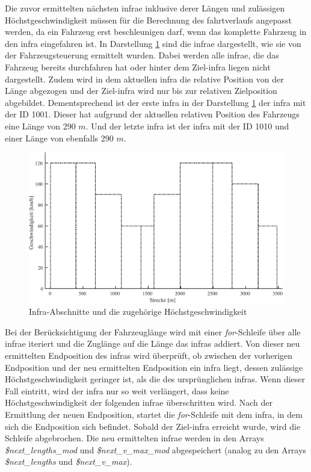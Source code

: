 Die zuvor ermittelten nächsten \ac{infra}e inklusive derer Längen und zulässigen Höchstgeschwindigkeit müssen für die Berechnung des \Gls{fahrtverlauf}s angepasst werden, da ein Fahrzeug erst beschleunigen darf, wenn das komplette Fahrzeug in den \ac{infra} eingefahren ist. In Darstellung \ref{fig:it1} sind die \ac{infra}e dargestellt, wie sie von der Fahrzeugsteuerung ermittelt wurden. Dabei werden alle \ac{infra}e, die das Fahrzeug bereits durchfahren hat oder hinter dem Ziel-\ac{infra} liegen nicht dargestellt. Zudem wird in dem aktuellen \ac{infra} die relative Position von der Länge abgezogen und der Ziel-\ac{infra} wird nur bis zur relativen Zielposition abgebildet. Dementsprechend ist der erste \ac{infra} in der Darstellung \ref{fig:it1} der \ac{infra} mit der ID 1001. Dieser hat aufgrund der aktuellen relativen Position des Fahrzeugs eine Länge von 290 $m$. Und der letzte \ac{infra} ist der \ac{infra} mit der ID 1010 und einer Länge von ebenfalls 290 $m$.
\begin{figure}
  \includegraphics[width=\linewidth]{../images/matlab/it1.pdf}
  \caption{Infra-Abschnitte und die zugehörige Höchstgeschwindigkeit}
  \label{fig:it1}
\end{figure}

Bei der Berücksichtigung der Fahrzeuglänge wird mit einer \textit{for}-Schleife über alle \ac{infra}e iteriert und die Zuglänge auf die Länge das \ac{infra}s addiert. Von dieser neu ermittelten Endposition des \ac{infra}s wird überprüft, ob zwischen der vorherigen Endposition und der neu ermittelten Endposition ein \ac{infra} liegt, dessen zulässige Höchstgeschwindigkeit geringer ist, als die des ursprünglichen \ac{infra}s. Wenn dieser Fall eintritt, wird der \ac{infra} nur so weit verlängert, dass keine Höchstgeschwindigkeit der folgenden \ac{infra}e überschritten wird. Nach der Ermittlung der neuen Endposition, startet die \textit{for}-Schleife mit dem \ac{infra}, in dem sich die Endposition sich befindet. Sobald der Ziel-\ac{infra} erreicht wurde, wird die Schleife abgebrochen. Die neu ermittelten \ac{infra}e werden in den Arrays \textit{\$next\_lengths\_mod} und \textit{\$next\_v\_max\_mod} abgespeichert (analog zu den Arrays \textit{\$next\_lengths} und \textit{\$next\_v\_max}). 

